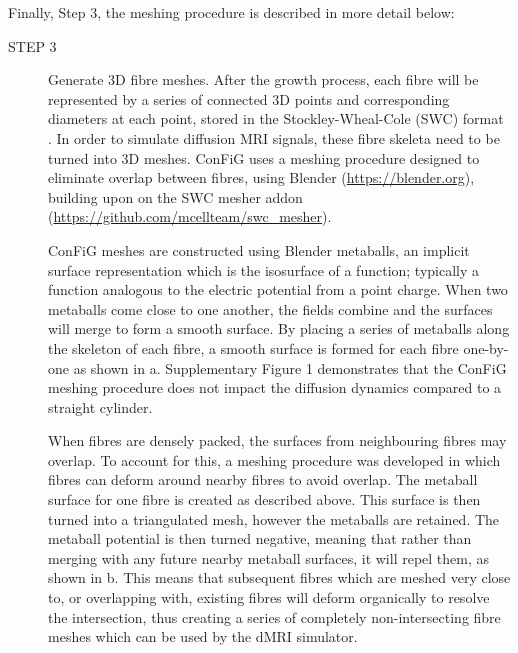 Finally, Step 3, the meshing procedure is described in more detail below:
\begin{description}
  \item [STEP 3] Generate 3D fibre meshes. After the growth process, each fibre will be represented by a series of connected 3D points and corresponding diameters at each point, stored in the Stockley-Wheal-Cole (SWC) format \cite{Stockley1993}. In order to simulate diffusion MRI signals, these fibre skeleta need to be turned into 3D meshes. ConFiG uses a meshing procedure designed to eliminate overlap between fibres, using Blender (\url{https://blender.org}), building upon on the SWC mesher addon (\url{https://github.com/mcellteam/swc_mesher}).

ConFiG meshes are constructed using Blender metaballs, an implicit surface representation which is the isosurface of a function; typically a function analogous to the electric potential from a point charge. When two metaballs come close to one another, the fields combine and the surfaces will merge to form a smooth surface. By placing a series of metaballs along the skeleton of each fibre, a smooth surface is formed for each fibre one-by-one as shown in a. Supplementary Figure 1 demonstrates that the ConFiG meshing procedure does not impact the diffusion dynamics compared to a straight cylinder.

When fibres are densely packed, the surfaces from neighbouring fibres may overlap. To account for this, a meshing procedure was developed in which fibres can deform around nearby fibres to avoid overlap. The metaball surface for one fibre is created as described above. This surface is then turned into a triangulated mesh, however the metaballs are retained. The metaball potential is then turned negative, meaning that rather than merging with any future nearby metaball surfaces, it will repel them, as shown in b. This means that subsequent fibres which are meshed very close to, or overlapping with, existing fibres will deform organically to resolve the intersection, thus creating a series of completely non-intersecting fibre meshes which can be used by the dMRI simulator.

\end{description}


